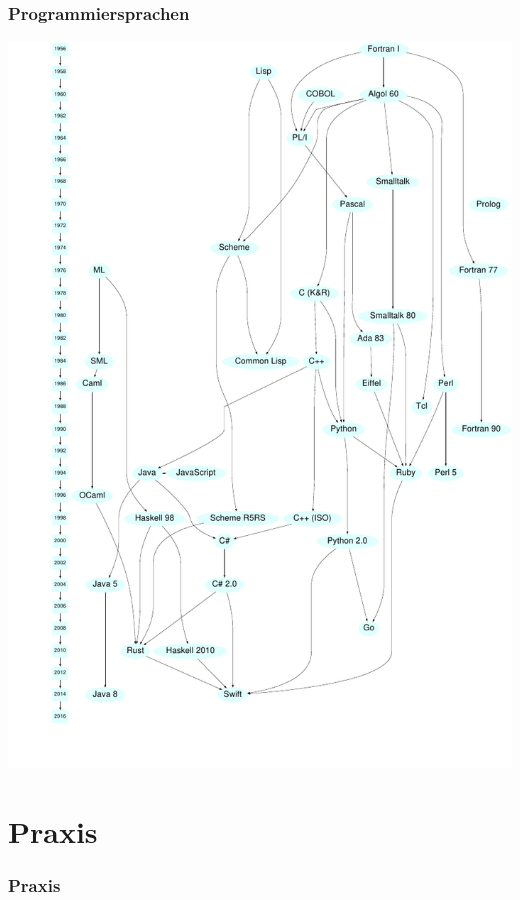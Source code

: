 \documentclass{beamer}
\begin{document}
	\begin{frame}
		\frametitle{Programmiersprachen}
		\centering \includegraphics[height=.85\textheight]{Sprachen-Diagramm.pdf}
	\end{frame}

	\section{Praxis}
	\begin{frame}
		\frametitle{Praxis}
	\end{frame}
\end{document}
